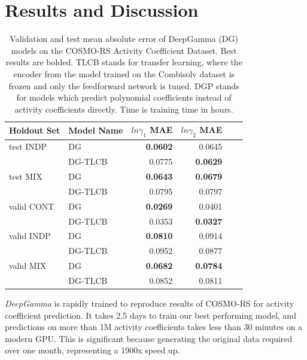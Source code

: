 \section{Results and Discussion}

\begin{table}
    \centering
    \caption{Validation and test mean absolute error of DeepGamma (DG) models on the COSMO-RS Activity  Coefficient Dataset. Best results are bolded. TLCB stands for transfer learning, where the encoder from the model trained on the Combisolv dataset is frozen and only the feedforward network is tuned. DGP stands for models which predict polynomial coefficients instead of activity coefficients directly. Time is training time in hours.}
    \label{cosmo_rs_results}
    \begin{tabular}{llrrrr}
    \toprule
    Holdout Set & Model Name &  $ln\gamma_1$ MAE &   $ln\gamma_2$ MAE \\
    \midrule
    test INDP & DG & \textbf{0.0602} & 0.0645 \\
              & DG-TLCB & 0.0775 & \textbf{0.0629} \\
    test MIX & DG & \textbf{0.0643} & \textbf{0.0679} \\
              & DG-TLCB & 0.0795 & 0.0797 \\
    valid CONT & DG & \textbf{0.0269} & 0.0401 \\
                & DG-TLCB & 0.0353 & \textbf{0.0327} \\
    valid INDP & DG & \textbf{0.0810 }& 0.0914 \\
              & DG-TLCB & 0.0952 & 0.0877 \\
    valid MIX & DG & \textbf{0.0682 }& \textbf{0.0784} \\
              & DG-TLCB & 0.0852 & 0.0811 \\
    \bottomrule
    \end{tabular}
\end{table}


\textit{DeepGamma} is rapidly trained to reproduce results of COSMO-RS for activity coefficient prediction. It takes 2.5 days to train our best performing model, and predictions on more than 1M activity coefficients takes less than 30 minutes on a modern GPU. This is significant because generating the original data required over one month, representing a 1900x speed up.


